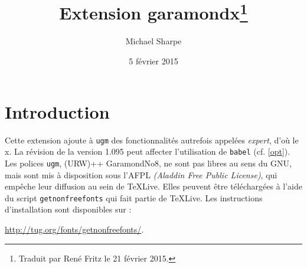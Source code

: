 \documentclass[12pt,english,french]{article}
\title{Extension garamondx\thanks{Traduit par René Fritz le 21 février 2015.}}
\author{Michael Sharpe}
\date{5 février 2015}  %
\newcommand{\mnu}[1]{\texttt{#1}}
\begin{document}
\maketitle
\section{Introduction}\enlargethispage*{2\baselineskip}
%
%

Cette extension ajoute à \mnu{ugm} des fonctionnalités autrefois appelées \emph{expert}, d'où le x. La révision de la version 1.095 peut affecter l'utilisation de \texttt{babel} (cf. \cref{opt}). Les polices \texttt{ugm}, (URW)++ GaramondNo8, ne sont pas libres au sens du GNU, mais sont mis à disposition sous l'AFPL \emph{(Aladdin Free Public License)}, qui empêche leur diffusion au sein de \TeX Live. Elles peuvent être téléchargées à l'aide du script \texttt{getnonfreefonts} qui fait partie de \TeX Live. Les instructions d'installation sont disponibles sur : 

\noindent\url{http://tug.org/fonts/getnonfreefonts/}.
\end{document}
